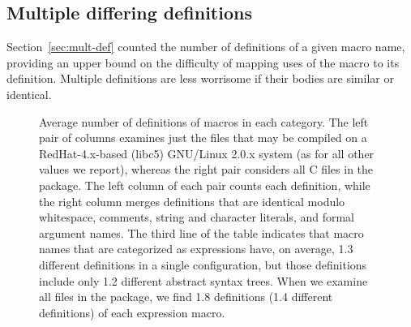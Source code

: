 \documentclass[10pt]{article}
\newcommand{\captionsmall}[1]{\caption[]{\small #1}}
\begin{document}
        
\subsection{Multiple differing definitions}
\label{sec:mult-diff-def}

Section~\ref{sec:mult-def} counted the number of definitions of a given
macro name, providing an upper bound on the difficulty of
mapping uses of the macro to its definition.  
Multiple definitions are less worrisome if
their bodies are similar or identical.

        
%   

\begin{figure}
  {\small\centerline{}}
  \captionsmall{Average number of definitions of macros in each category.
    The left pair of columns examines just the files that may be compiled
    on a RedHat-4.x-based (libc5) GNU/Linux 2.0.x system (as for all other values we
    report), whereas the right pair considers all C files in the package.
    The left column of each pair counts each definition, while the right
    column merges definitions that are identical modulo whitespace,
    comments, string and character literals, and formal argument names.
    The third line of the table indicates that macro names that are
    categorized as expressions have, on average, 1.3 different definitions
    in a single configuration, but those definitions include only 1.2
    different abstract syntax trees.  When we examine all files in the
    package, we find 1.8 definitions (1.4 different
    definitions) of each expression macro.}
  \label{fig:freq-sum-cat}
\end{figure}
\end{document}
